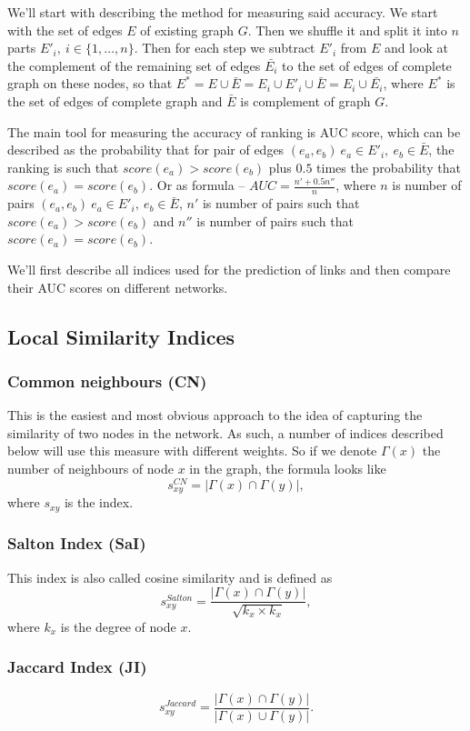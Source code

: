 \documentclass{llncs}
\begin{document}
We'll start with describing the method for measuring said accuracy. We start with the set of edges $E$ of existing graph $G$. Then we shuffle it and split it into $n$ parts $E'_i, \ i \in \{1, \ldots, n\}$. Then for each step we subtract $E'_i$ from $E$ and look at the complement of the remaining set of edges $\bar{E_i}$ to the set of edges of complete graph on these nodes, so that $E^* = E \cup \bar{E} = E_i \cup E'_i \cup \bar{E} = E_i \cup \bar{E_i}$, where $E^*$ is the set of edges of complete graph and $\bar{E}$ is complement of graph $G$.

The main tool for measuring the accuracy of ranking is AUC score, which can be described as the probability that for pair of edges $(e_a, e_b) \ e_a \in E'_i, \ e_b \in \bar{E}$, the ranking is such that $score(e_a) > score(e_b)$ plus $0.5$ times the probability that $score(e_a) = score(e_b)$. Or as formula -- $AUC = \frac{n' + 0.5 n''}{n}$, where $n$ is number of pairs $(e_a, e_b) \ e_a \in E'_i, \ e_b \in \bar{E}$, $n'$ is number of pairs such that $score(e_a) > score(e_b)$ and $n''$ is number of pairs such that $score(e_a) = score(e_b)$.

We'll first describe all indices used for the prediction of links and then compare their AUC scores on different networks.
%
\subsection{Local Similarity Indices}
%
\subsubsection{Common neighbours (CN)}
%
This is the easiest and most obvious approach to the idea of capturing the similarity of two nodes in the network. As such, a number of indices described below will use this measure with different weights. So if we denote $\Gamma(x)$ the number of neighbours of node $x$ in the graph, the formula looks like
$$s_{xy}^{CN} = |\Gamma(x) \cap \Gamma(y)|,$$
where $s_{xy}$ is the index.
%
\subsubsection{Salton Index (SaI)}
%
This index is also called cosine similarity and is defined as
$$s_{xy}^{Salton} = \frac{|\Gamma(x) \cap \Gamma(y)|}{\sqrt{k_x \times k_x}},$$
where $k_x$ is the degree of node $x$.
%
\subsubsection{Jaccard Index (JI)}
%
$$s_{xy}^{Jaccard} = \frac{|\Gamma(x) \cap \Gamma(y)|}{|\Gamma(x) \cup \Gamma(y)|}.$$
%
\end{document}
